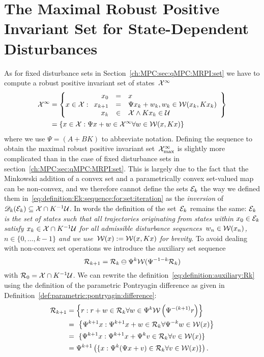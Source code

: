 \section{The Maximal Robust Positive Invariant Set for State-Dependent Disturbances}\label{ch:MPC:sec:state:dist:MRPI}
\resetforsection
%
%
\mysplit As for fixed disturbance sets in Section~\ref{ch:MPC:sec:qMPC:MRPI:set} we have to compute a robust positive invariant set of states~$\mathcal X^\infty$
%
\begin{equation}\begin{aligned}
	\mathcal X^\infty &= \left\{x\in\mathcal X:\begin{array}{rcl}x_0 &=& x\\
	x_{k+1} &=& \Psi x_k + w_k, w_k\in\mathcal W(x_k,Kx_k)\\
	x_k&\in&\mathcal X\wedge Kx_k\in\mathcal U\end{array}\right\}\\
	 &= \left\{x\in\mathcal X:\Psi x+w\in\mathcal X^\infty\forall w\in\mathcal W(x,Kx)\right\}
\end{aligned}\end{equation}
%
where we use $\Psi = (A+BK)$ to abbreviate notation.
%
Defining the sequence to obtain the maximal robust positive invariant set~$\mathcal X^\infty_{\max}$ is slightly more complicated than in the case of fixed disturbance sets in section~\ref{ch:MPC:sec:qMPC:MRPI:set}.
%
This is largely due to the fact that the Minkowski addition of a convex set and a parametrically convex set-valued map can be non-convex, and we therefore cannot define the sets $\mathcal E_k$ the way we defined them in~\eqref{eq:definition:Ek:sequence:for:set:iteration} as the \emph{inversion} of $\mathscr D_k(\mathcal E_k)\subseteq\mathcal X\cap K^{-1}\mathcal U$.
%
In words the definition of the set~$\mathcal E_k$ remains the same: \emph{$\mathcal E_k$ is the set of states such that all trajectories originating from states within $x_0\in\mathcal E_k$ satisfy $x_k\in\mathcal X\cap K^{-1}\mathcal U$ for all admissible disturbance sequences~$w_n\in\mathcal W(x_n)$, $n\in\{0,\dots,k-1\}$ and we use~$\mathcal W(x):=\mathcal W(x,Kx)$ for brevity}.
%
To avoid dealing with non-convex set operations we introduce the auxiliary set sequence
%
\begin{equation}\label{eq:definition:auxiliary:Rk}
	\mathcal R_{k+1} = \mathcal R_k\ominus\Psi^{k}\mathcal W(\Psi^{-1-k}\mathcal R_k)
\end{equation}
%
with $\mathcal R_0 = \mathcal X\cap K^{-1}\mathcal U$.
%
We can rewrite the definition~\eqref{eq:definition:auxiliary:Rk} using the definition of the parametric Pontryagin difference as given in Definition~\eqref{def:parametric:pontryagin:difference}:
%
\begin{equation}\label{eq:definition:Rk:dual:of:Ek}\begin{aligned}
	\R_{k+1} &= \left\{r:r+w\in\R_k\forall w\in\Psi^{k}\W\left(\Psi^{-(k+1)}r\right)\right\} \\
	&= \left\{\Psi^{k+1}x:\Psi^{k+1}x+w\in\R_k\forall \Psi^{-k} w\in\W(x)\right\}\\
	&= \{\Psi^{k+1}x:\Psi^{k+1}x+\Psi^k v\in\R_k\forall v\in\W(x)\}\\
	&= \Psi^{k+1}\left(\{x:\Psi^k(\Psi x+v)\in\R_k\forall v\in\W(x)\}\right).
\end{aligned}\end{equation}
